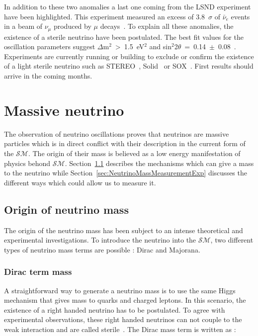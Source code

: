 \documentclass[main.tex]{subfiles}
\begin{document}
\bigskip


\NI In addition to these two anomalies a last one coming from the LSND experiment have been highlighted. This experiment measured an excess of 3.8~$\sigma$ of $\bar{\nu}_e$ events in a beam of $\nu_\mu$ produced by $\mu$ decays~\cite{LSND}. To explain all these anomalies, the existence of a sterile neutrino have been postulated. The best fit values for the oscillation parameters suggest $\Delta$m$^\text{2}$~>~1.5~eV$^\text{2}$ and sin$^\text{2}$2$\theta$~=~0.14~$\pm$~0.08~\cite{ReactorAnomaly}. Experiments are currently running or building to exclude or confirm the existence of a light sterile neutrino such as STEREO~\cite{STERO}, Solid~\cite{Solid} or SOX~\cite{SOX}. First results should arrive in the coming months.


\FloatBarrier


\section{Massive neutrino}\label{sec:MassiveNeutrino}

\NI The observation of neutrino oscillations proves that neutrinos are massive particles which is in direct conflict with their description in the current form of the $\mathcal{SM}$. The origin of their mass is believed as a low energy manifestation of physics behond $\mathcal{SM}$. Section~\ref{sec:OriginNeutrinoMass} describes the mechanisms which can give a mass to the neutrino while Section~\ref{sec:NeutrinoMassMeasurementExp} discusses the different ways which could allow us to measure it.


\subsection{Origin of neutrino mass}\label{sec:OriginNeutrinoMass}


\NI The origin of the neutrino mass has been subject to an intense theoretical and experimental investigations. To introduce the neutrino into the $\mathcal{SM}$, two different types of neutrino mass terms are possible : Dirac and Majorana.

\subsubsection{Dirac term mass}


\NI A straightforward way to generate a neutrino mass is to use the same Higgs mechanism that gives mass to quarks and charged leptons. In this scenario, the existence of a right handed neutrino has to be postulated. To agree with experimental observations, these right handed neutrinos can not couple to the weak interaction and are called sterile~\cite{DiracNeutrino}. The Dirac mass term is written as : 
\end{document}
